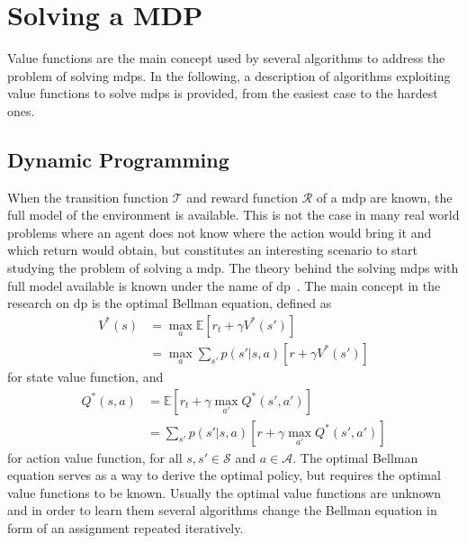 \section{Solving a MDP}
Value functions are the main concept used by several algorithms to address the problem of solving \glspl{mdp}. In the following, a description of algorithms exploiting value functions to solve \glspl{mdp} is provided, from the easiest case to the hardest ones.

\subsection{Dynamic Programming}
When the transition function $\mathcal{T}$ and reward function $\mathcal{R}$ of a \gls{mdp} are known, the full model of the environment is available. This is not the case in many real world problems where an agent does not know where the action would bring it and which return would obtain, but constitutes an interesting scenario to start studying the problem of solving a \gls{mdp}. The theory behind the solving \glspl{mdp} with full model available is known under the name of \gls{dp}~\cite{bertsekas2005dynamic, bellman2013dynamic}. The main concept in the research on \gls{dp} is the optimal Bellman equation, defined as
\begin{align}
 V^*(s) &= \max_a \mathbb{E}[r_t + \gamma V^*(s')]\nonumber\\
        &= \max_a \sum_{s'} p(s' | s, a)[r + \gamma V^*(s')]
\end{align}
for state value function, and
\begin{align}
 Q^*(s,a) &= \mathbb{E}[r_t + \gamma \max_{a'}Q^*(s', a')]\nonumber\\
          &= \sum_{s'} p(s' | s, a)[r + \gamma \max_{a'}Q^*(s', a')]
\end{align}
for action value function, for all $s, s' \in \mathcal{S}$ and $a \in \mathcal{A}$.
The optimal Bellman equation serves as a way to derive the optimal policy, but requires the optimal value functions to be known. Usually the optimal value functions are unknown and in order to learn them several algorithms change the Bellman equation in form of an assignment repeated iteratively.

